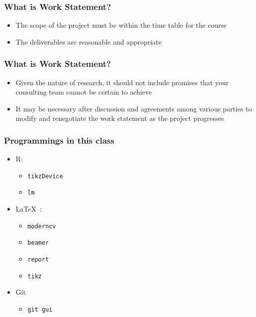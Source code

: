 \documentclass[hyperref={colorlinks=false},compress,handout,10pt]{beamer}
\let\olditem\item
\renewcommand{\item}{\setlength{\itemsep}{0.5\baselineskip}\olditem}
\def\LaTeXs{\LaTeX\ }
\begin{document}
\begin{frame}
    \frametitle{What is Work Statement?}
    \begin{itemize}
        \item The scope of the project must be within the time table for the
            course
            \vspace{1cm}
        \item The deliverables are reasonable and appropriate
    \end{itemize}
\end{frame}
\begin{frame}
    \frametitle{What is Work Statement?}
    \begin{itemize}
        \item Given the nature of research, it should not include promises
            that your consulting team cannot be certain to achieve
            \vspace{1cm}
        \item It may be necessary after discussion and agreements among
            various parties to modify and renegotiate the work statement as 
            the project progresses
    \end{itemize}
\end{frame}

            
\begin{frame}
    \frametitle{Programmings in this class}
    \begin{itemize}
        \item R:
            \begin{itemize}
                \item \texttt{tikzDevice}
                \item \texttt{lm}
            \end{itemize}
        \item \LaTeXs: 
            \begin{itemize}
                \item \texttt{moderncv}
                \item \texttt{beamer}
                \item \texttt{report}
                \item \texttt{tikz}
            \end{itemize}
        \item Git
            \begin{itemize}
                \item \texttt{git gui}
            \end{itemize}
    \end{itemize}
\end{frame}
\end{document}
